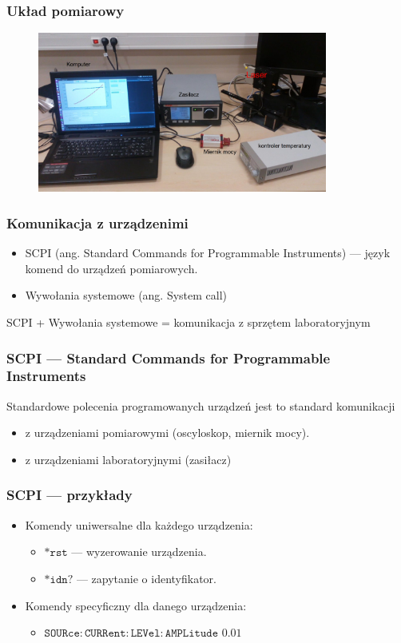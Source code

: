 \documentclass[xcolor={dvipsnames,table}]{beamer}
\begin{document}
\begin{frame}
\frametitle{Układ pomiarowy}
\begin{figure}
   \includegraphics[width=0.85\textwidth,natwidth=69,natheight=87]{uklad.jpg}
\end{figure}
\end{frame}


\begin{frame}
\frametitle{Komunikacja z urządzenimi}
\begin{itemize}
\item SCPI (ang. Standard Commands for Programmable Instruments) --- język komend do urządzeń pomiarowych.
\item Wywołania systemowe (ang. System call)
\end{itemize}
SCPI + Wywołania systemowe = komunikacja z sprzętem laboratoryjnym
\end{frame}

\begin{frame}
\frametitle{SCPI --- Standard Commands for Programmable Instruments}
Standardowe polecenia programowanych urządzeń jest to standard komunikacji
\begin{itemize}
\item z urządzeniami pomiarowymi (oscyloskop, miernik mocy).
\item z urządzeniami laboratoryjnymi (zasiłacz)
\end{itemize} 
\end{frame}

\begin{frame}
\frametitle{SCPI --- przykłady}
\begin{itemize}
\item Komendy uniwersalne dla każdego urządzenia:
\begin{itemize}
\item $\mathtt{*rst}$ --- wyzerowanie urządzenia.
\item $\mathtt{*idn?}$ --- zapytanie o identyfikator.
\end{itemize}
\item Komendy specyficzny dla danego urządzenia:
\begin{itemize}
\item $\mathtt{SOURce:CURRent:LEVel:AMPLitude}$  $\mathtt{0.01}$
\end{itemize}
\end{itemize}
\end{frame}
\end{document}
